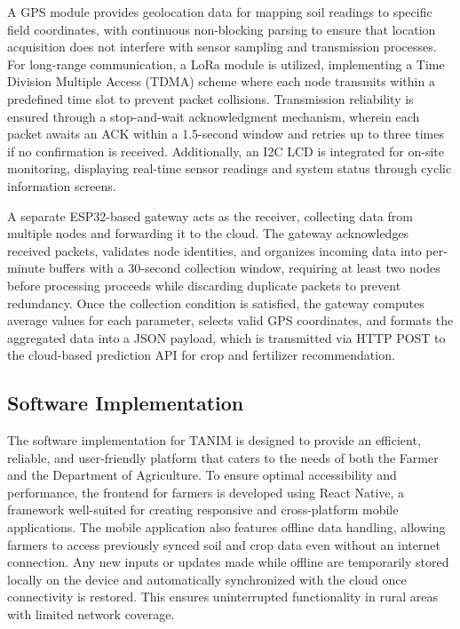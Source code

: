 {	A GPS module provides geolocation data for mapping soil readings to specific field coordinates, with continuous non-blocking parsing to ensure that location acquisition does not interfere with sensor sampling and transmission processes. For long-range communication, a LoRa module is utilized, implementing a Time Division Multiple Access (TDMA) scheme where each node transmits within a predefined time slot to prevent packet collisions. Transmission reliability is ensured through a stop-and-wait acknowledgment mechanism, wherein each packet awaits an ACK within a 1.5-second window and retries up to three times if no confirmation is received. Additionally, an I2C LCD is integrated for on-site monitoring, displaying real-time sensor readings and system status through cyclic information screens.
	
	A separate ESP32-based gateway acts as the receiver, collecting data from multiple nodes and forwarding it to the cloud. The gateway acknowledges received packets, validates node identities, and organizes incoming data into per-minute buffers with a 30-second collection window, requiring at least two nodes before processing proceeds while discarding duplicate packets to prevent redundancy. Once the collection condition is satisfied, the gateway computes average values for each parameter, selects valid GPS coordinates, and formats the aggregated data into a JSON payload, which is transmitted via HTTP POST to the cloud-based prediction API for crop and fertilizer recommendation.
	
	\subsection{Software Implementation}
	The software implementation for TANIM is designed to provide an efficient, reliable, and user-friendly platform that caters to the needs of both the Farmer and the Department of Agriculture. To ensure optimal accessibility and performance, the frontend for farmers is developed using React Native, a framework well-suited for creating responsive and cross-platform mobile applications. The mobile application also features offline data handling, allowing farmers to access previously synced soil and crop data even without an internet connection. Any new inputs or updates made while offline are temporarily stored locally on the device and automatically synchronized with the cloud once connectivity is restored. This ensures uninterrupted functionality in rural areas with limited network coverage.
	
}
